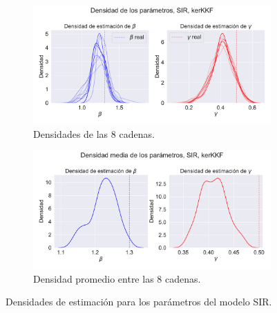 \begin{figure}[h!]
    \centering
    \begin{subfigure}[b]{0.8\textwidth}
        \centering\includegraphics[width=0.8\linewidth]{img/content/chapter4/nonlinear_filters_sir_params_density.pdf}
    \caption{Densidades de las 8 cadenas.}
    \label{fig:nonlinear_filters_sir_params_density}
    \end{subfigure}
        
    \begin{subfigure}[b]{0.8\textwidth}
        \centering \includegraphics[width=0.8\linewidth]{img/content/chapter4/nonlinear_filters_sir_params_density_mean.pdf}
    \caption{Densidad promedio entre las 8 cadenas.}
    \label{fig:nonlinear_filters_sir_params_density_mean}
    \end{subfigure}
    \caption{Densidades de estimación para los parámetros del modelo SIR.}
\end{figure}

